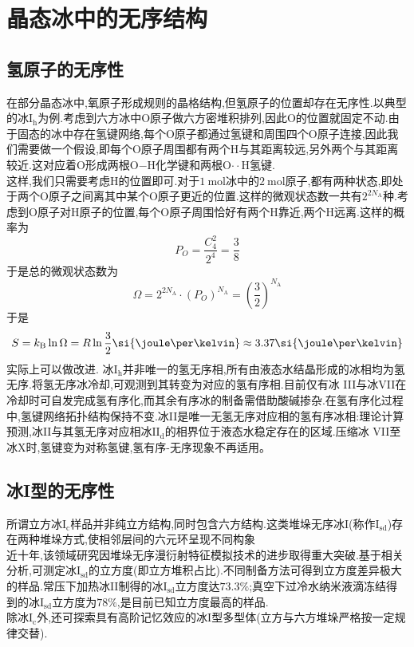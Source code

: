 \documentclass{ctexart}
\author{邵天诚\ 2400011710\and 蒋锦豪\ 2400011785}
\title{\tbf{冰的微观结构}}
\date{}
\begin{document}
\pagestyle{empty}
\maketitle
\section{晶态冰中的无序结构\cite{Salzmann2019}}
\subsection{氢原子的无序性}
在部分晶态冰中,氧原子形成规则的晶格结构,但氢原子的位置却存在无序性.以典型的冰$\text{I}_\text{h}$为例.考虑到六方冰中O原子做六方密堆积排列,因此O的位置就固定不动.由于固态的冰中存在氢键网络,每个O原子都通过氢键和周围四个O原子连接,因此我们需要做一个假设,即每个O原子周围都有两个H与其距离较远,另外两个与其距离较近.这对应着O形成两根O$-$H化学键和两根O$\cdot\cdot$H氢键.\\
\indent 这样,我们只需要考虑H的位置即可.对于$\SI{1}{\mole}$冰中的$\SI{2}{\mole}$原子,都有两种状态,即处于两个O原子之间离其中某个O原子更近的位置.这样的微观状态数一共有$2^{2N_{\text{A}}}$种.考虑到O原子对H原子的位置,每个O原子周围恰好有两个H靠近,两个H远离.这样的概率为
\[P_O=\dfrac{C_4^2}{2^4}=\dfrac{3}{8}\]
于是总的微观状态数为
\[\Omega=2^{2N_{\text{A}}}\cdot\left(P_O\right)^{N_{\text{A}}}=\left(\dfrac32\right)^{N_{\text{A}}}\]
于是
\[S=k_\text B\ln\Omega=R\ln\dfrac32\si{\joule\per\kelvin}\approx3.37\si{\joule\per\kelvin}\]
实际上可以做改进\cite{Li2024}.
\indent 冰$\text{I}_{\text{h}}$并非唯一的氢无序相,所有由液态水结晶形成的冰相均为氢无序.将氢无序冰冷却,可观测到其转变为对应的氢有序相.目前仅有冰 III与冰VII在冷却时可自发完成氢有序化,而其余有序冰的制备需借助酸碱掺杂.在氢有序化过程中,氢键网络拓扑结构保持不变.冰II是唯一无氢无序对应相的氢有序冰相:理论计算预测,冰II与其氢无序对应相冰$\text{II}_\text{d}$的相界位于液态水稳定存在的区域.压缩冰 VII至冰X时,氢键变为对称氢键,氢有序-无序现象不再适用。
\subsection{冰I型的无序性}
所谓立方冰$\text{I}_\text{c}$样品并非纯立方结构,同时包含六方结构.这类堆垛无序冰I(称作$\text{I}_{\text{sd}}$)存在两种堆垛方式,使相邻层间的六元环呈现不同构象\\
\indent 近十年,该领域研究因堆垛无序漫衍射特征模拟技术的进步取得重大突破.基于相关分析,可测定冰$\text{I}_{\text{sd}}$的立方度(即立方堆积占比).不同制备方法可得到立方度差异极大的样品.常压下加热冰II制得的冰$\text{I}_{\text{sd}}$立方度达$73.3\%$;真空下过冷水纳米液滴冻结得到的冰$\text{I}_{\text{sd}}$立方度为$78\%$,是目前已知立方度最高的样品.\\
\indent 除冰$\text{I}_\text{c}$外,还可探索具有高阶记忆效应的冰I型多型体(立方与六方堆垛严格按一定规律交替).
\end{document}
